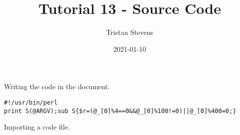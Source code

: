 \documentclass{article}
\title{Tutorial 13 - Source Code}
\date{2021-01-10}
\author{Tristan Stevens}
\begin{document}
\maketitle
\newpage

\noindent Writing the code in the document.
\begin{lstlisting}
#!/usr/bin/perl
print S(@ARGV);sub S{$r=(@_[0]%4==0&&@_[0]%100!=0)||@_[0]%400=0;}
\end{lstlisting}
Importing a code file.

\end{document}
